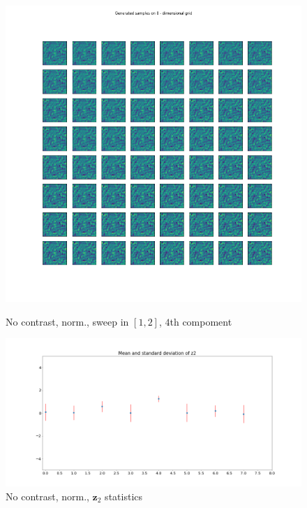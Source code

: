 \documentclass[12pt, english]{article}
\begin{document}
\begin{figure}[H] 
  \label{fig:contrast-correlation} 
  \begin{minipage}{0.4\linewidth}
    \centering
    \includegraphics[width=.8\linewidth]{sweep/norm_no_contrast_sweep_one_to_two_4th_param.png} 
    \caption{No contrast, norm., sweep in $[1, 2]$, $4$th compoment} 
    \label{fig:no-contrast-norm-sweep}
  \end{minipage}%
  \begin{minipage}{0.6\linewidth}
    \centering
    \includegraphics[width=1\linewidth]{sweep/norm_no_contrast_z2_stats.png} 
    \caption{No contrast, norm.,  $\bm{z}_{2}$ statistics} 
    \label{fig:no-contrast-no-norm-stats}
  \end{minipage} 
\end{figure}

\vspace{4mm} 
 
\end{document}
